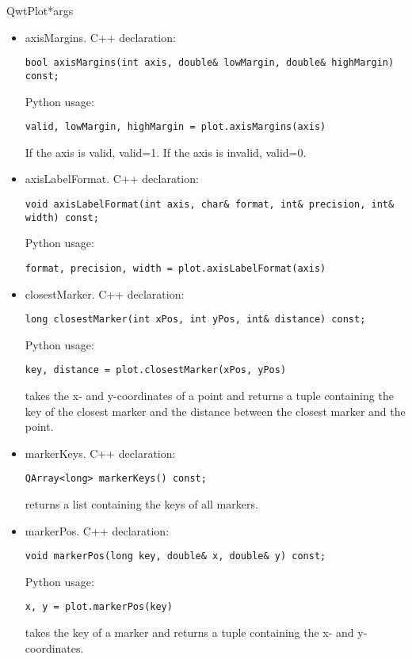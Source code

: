 \documentclass{manual}
\begin{document}
\begin{classdesc}{QwtPlot}{*args}
\begin{itemize}
    \item{axisMargins}. C++ declaration:
      \begin{verbatim}
bool axisMargins(int axis, double& lowMargin, double& highMargin) const;
      \end{verbatim}
      Python usage:
      \begin{verbatim}
valid, lowMargin, highMargin = plot.axisMargins(axis)
      \end{verbatim}
      If the axis is valid, valid=1. If the axis is invalid, valid=0.

    \item{axisLabelFormat}. C++ declaration:
      \begin{verbatim}
void axisLabelFormat(int axis, char& format, int& precision, int& width) const;
      \end{verbatim}
      Python usage:
      \begin{verbatim}
format, precision, width = plot.axisLabelFormat(axis)
      \end{verbatim}

    \item{closestMarker}. C++ declaration:
      \begin{verbatim}
long closestMarker(int xPos, int yPos, int& distance) const;
      \end{verbatim}
      Python usage:
      \begin{verbatim}
key, distance = plot.closestMarker(xPos, yPos)
      \end{verbatim}
       takes the x- and y-coordinates of a point and
      returns a tuple containing the key of the closest marker and the distance
      between the closest marker and the point.

    \item{markerKeys}. C++ declaration:
      \begin{verbatim}
QArray<long> markerKeys() const;
      \end{verbatim}
       returns a list containing the keys of all markers.

    \item{markerPos}. C++ declaration:
      \begin{verbatim}
void markerPos(long key, double& x, double& y) const;
      \end{verbatim}
      Python usage:
      \begin{verbatim}
x, y = plot.markerPos(key)
      \end{verbatim}
       takes the key of a marker and returns a tuple containing
      the x- and y-coordinates.

  \end{itemize}
\end{classdesc}
\end{document}
